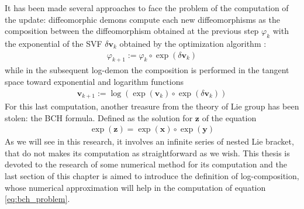 It has been made several approaches to face the problem of the computation of the update: diffeomorphic demons compute each new diffeomorphisms as the composition between the diffeomorphism obtained at the previous step $\varphi_{k}$ with the exponential of the SVF $\delta\mathbf{v}_{k}$ obtained by the optimization algorithm :
\begin{align*}
\varphi_{k + 1} := \varphi_{k}  \circ \exp(\delta\mathbf{v}_{k})
\end{align*}
while in the subsequent log-demon \cite{vercauteren08} the composition is performed in the tangent space toward exponential and logarithm functions
\begin{align}\label{eq:bch_problem}
\mathbf{v}_{k + 1} := \log( \exp(\mathbf{v}_{k})  \circ \exp(\delta\mathbf{v}_{k}))
\end{align}
For this last computation, another treasure from the theory of Lie group has been stolen: the BCH formula. Defined as the solution for $\mathbf{z}$ of the equation 
\begin{align*}
 \exp(\mathbf{z}) = \exp(\mathbf{x})\circ\exp(\mathbf{y})
\end{align*}
As we will see in this research, it involves an infinite series of nested Lie bracket, that do not makes its computation as straightforward as we wish. This thesis is devoted to the research of some numerical method for its computation and the last section of this chapter is aimed to introduce the definition of log-composition, whose numerical approximation will help in the computation of equation \ref{eq:bch_problem}.


